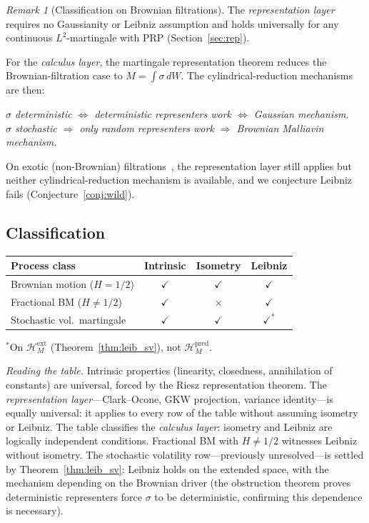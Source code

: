 \documentclass[11pt,a4paper]{article}
\theoremstyle{plain}
\theoremstyle{definition}
\theoremstyle{remark}
\newtheorem{remark}[theorem]{Remark}
\newcommand{\HM}{\mathcal{H}_M}
\begin{document}
\begin{remark}[Classification on Brownian filtrations]\label{rem:obstr_interp}
The \emph{representation layer} requires no Gaussianity or Leibniz assumption and holds universally for any continuous $L^2$-martingale with PRP (Section~\ref{sec:rep}).

For the \emph{calculus layer}, the martingale representation theorem reduces the Brownian-filtration case to $M = \int\sigma\,dW$. The cylindrical-reduction mechanisms are then:
\begin{center}
\emph{$\sigma$ deterministic $\Leftrightarrow$ deterministic representers work $\Leftrightarrow$ Gaussian mechanism.}\\
\emph{$\sigma$ stochastic $\Rightarrow$ only random representers work $\Rightarrow$ Brownian Malliavin mechanism.}
\end{center}
On exotic (non-Brownian) filtrations~\cite{Tsirelson1975}, the representation layer still applies but neither cylindrical-reduction mechanism is available, and we conjecture Leibniz fails (Conjecture~\ref{conj:wild}).
\end{remark}


\subsection{Classification}

\begin{center}
\begin{tabular}{lccc}
\toprule
\textbf{Process class} & \textbf{Intrinsic} & \textbf{Isometry} & \textbf{Leibniz} \\
\midrule
Brownian motion ($H = 1/2$) & $\checkmark$ & $\checkmark$ & $\checkmark$ \\
Fractional BM ($H \neq 1/2$) & $\checkmark$ & $\times$ & $\checkmark$ \\
Stochastic vol.\ martingale & $\checkmark$ & $\checkmark$ & $\checkmark^{*}$ \\
\bottomrule
\end{tabular}
\end{center}
\smallskip\noindent
${}^{*}$On $\HM^{\mathrm{ext}}$ (Theorem~\ref{thm:leib_sv}), not $\HM^{\mathrm{pred}}$.

\medskip

\emph{Reading the table.} Intrinsic properties (linearity, closedness, annihilation of constants) are universal, forced by the Riesz representation theorem. The \emph{representation layer}---Clark--Ocone, GKW projection, variance identity---is equally universal: it applies to every row of the table without assuming isometry or Leibniz. The table classifies the \emph{calculus layer}: isometry and Leibniz are logically independent conditions. Fractional BM with $H \neq 1/2$ witnesses Leibniz without isometry. The stochastic volatility row---previously unresolved---is settled by Theorem~\ref{thm:leib_sv}: Leibniz holds on the extended space, with the mechanism depending on the Brownian driver (the obstruction theorem proves deterministic representers force $\sigma$ to be deterministic, confirming this dependence is necessary).
\end{document}
